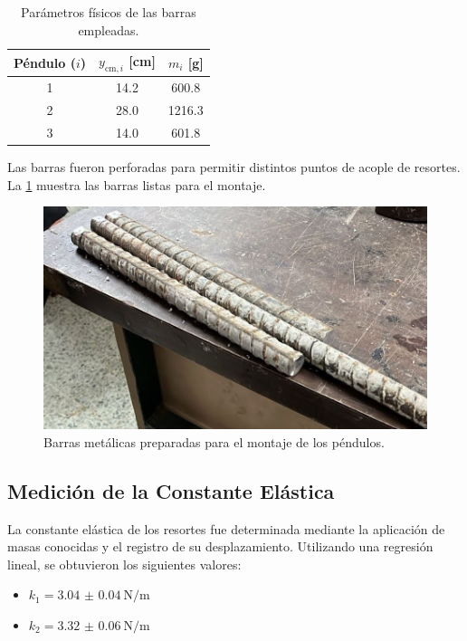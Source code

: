\begin{table}[htbp!]
    \centering
    \caption{Parámetros físicos de las barras empleadas.}
    \label{tab:parametros}
    \begin{tabular}{c c c}
        \toprule
        Péndulo ($i$) & $y_{\text{cm},i}$ [cm] & $m_i$ [g] \\
        \midrule
        1 & 14.2 & 600.8 \\
        2 & 28.0 & 1216.3 \\
        3 & 14.0 & 601.8 \\
        \bottomrule
    \end{tabular}
\end{table}

Las barras fueron perforadas para permitir distintos puntos de acople de resortes. La \cref{fig:barras} muestra las barras listas para el montaje.

\begin{figure}[htbp!]
    \centering
    \includegraphics[width=0.6\linewidth]{Figures/metal-bars.jpeg}
    \caption{Barras metálicas preparadas para el montaje de los péndulos.}
    \label{fig:barras}
\end{figure}

\subsection*{Medición de la Constante Elástica}

La constante elástica de los resortes fue determinada mediante la aplicación de masas conocidas y el registro de su desplazamiento. Utilizando una regresión lineal, se obtuvieron los siguientes valores:

\begin{itemize}
    \item $k_1 = \qty{3.04(4)}{\N\per\m}$
    \item $k_2 = \qty{3.32(6)}{\N\per\m}$
\end{itemize}

